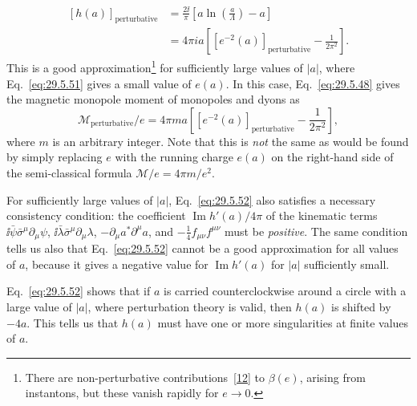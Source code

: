 \begin{equation}
  \begin{aligned}
  [h(a)]_{\mathrm{perturbative}}
  &=\frac{2\ii}{\pi}\left[
    a\ln\left(\frac{a}{\Lambda}\right)-a
  \right]
  \\
  &=4\pi ia\left[
    \left[e^{-2}(a)\right]_{\mathrm{perturbative}}
    -\frac{1}{2\pi^2}
  \right].
  \end{aligned}
  \tag{29.5.52}\label{eq:29.5.52}
\end{equation}
This is a good approximation\footnote{There are non-perturbative
contributions~\hyperref[ch29-ref-12]{[12]} to \(\beta(e)\), arising from
instantons, but these vanish rapidly for \(e\longrightarrow0\).} for
sufficiently large values of \(\lvert a\rvert\), where
Eq.~\eqref{eq:29.5.51} gives a small value of \(e(a)\). In this case,
Eq.~\eqref{eq:29.5.48} gives the magnetic monopole moment of monopoles and
dyons as
\begin{equation}
  \mathcal{M}_{\mathrm{perturbative}}/e
  =4\pi ma\left[
    \left[e^{-2}(a)\right]_{\mathrm{perturbative}}
    -\frac{1}{2\pi^2}
  \right],
  \tag{29.5.53}\label{eq:29.5.53}
\end{equation}
where \(m\) is an arbitrary integer. Note that this is \textit{not} the same
as would be found by simply replacing \(e\) with the running charge \(e(a)\)
on the right-hand side of the semi-classical formula
\(\mathcal{M}/e=4\pi m/e^2\).

{\setlength{\emergencystretch}{1em}%
For sufficiently large values of \(\lvert a\rvert\), Eq.~\eqref{eq:29.5.52}
also satisfies a necessary consistency condition: the coefficient
\(\operatorname{Im}h'(a)/4\pi\) of the kinematic terms
\(\ii\bar\psi\bar\sigma^\mu\partial_\mu\psi\),
\(\ii\bar\lambda\bar\sigma^\mu\partial_\mu\lambda\),
\(-\partial_\mu a^*\partial^\mu a\), and
\(-\tfrac14f_{\mu\nu}f^{\mu\nu}\) must be \textit{positive}. The same
condition tells us also that Eq.~\eqref{eq:29.5.52} cannot be a good
approximation for all values of \(a\), because it gives a negative value for
\(\operatorname{Im}h'(a)\) for \(\lvert a\rvert\) sufficiently small.\par}

Eq.~\eqref{eq:29.5.52} shows that if \(a\) is carried counterclockwise around
a circle with a large value of \(\lvert a\rvert\), where perturbation theory
is valid, then \(h(a)\) is shifted by \(-4a\). This tells us that \(h(a)\)
must have one or more singularities at finite values of \(a\).

